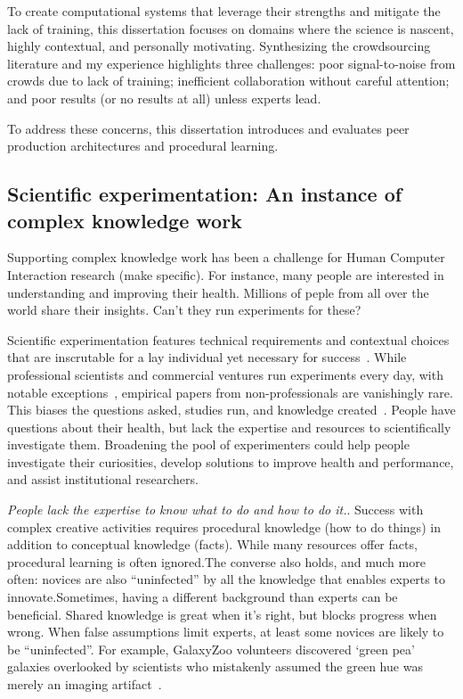 To create computational systems that leverage their strengths and mitigate the lack of training, this dissertation 
focuses on domains where the science is nascent, highly contextual, and personally motivating.
 Synthesizing the crowdsourcing literature and my experience highlights three challenges: 
poor signal-to-noise from crowds due to lack of training; inefficient collaboration without 
careful attention; and poor results (or no results at all) unless experts lead. 

To address  these concerns,  this dissertation introduces and evaluates peer production architectures 
and procedural learning.

\subsection{Scientific experimentation: An instance of complex knowledge work}
Supporting complex knowledge work has been a challenge for Human Computer Interaction
 research (make specific). For instance, many people are interested in understanding and 
improving their health. Millions of peple from all over the world share their insights. 
Can't they run experiments for these?

Scientific experimentation features technical requirements and contextual choices 
that are inscrutable for a lay individual yet necessary for success~\cite{Martin2007}. While 
professional scientists and commercial ventures run experiments every day, with 
notable exceptions~\cite{Cooper2010,DanaLewis}, empirical papers from non-professionals are 
vanishingly rare. This biases the questions asked, studies run, and knowledge 
created~\cite{Henrich2010a}. People have questions about their health, but lack the expertise 
and resources to scientifically investigate them. Broadening the pool of 
experimenters could help people investigate their curiosities, develop solutions 
to improve health and performance, and assist institutional researchers.

\textit{People lack the expertise to know what to do and how to do it.}. 
Success with complex creative activities requires procedural
knowledge (how to do things) in addition to conceptual
knowledge (facts). While many resources offer facts, procedural
learning is often ignored.The converse also holds, and much more often: novices are also
“uninfected” by all the knowledge that enables experts to
innovate.Sometimes, having a different background than experts can
be beneficial. Shared knowledge is great when it’s right, but
blocks progress when wrong. When false assumptions limit
experts, at least some novices are likely to be “uninfected”.
For example, GalaxyZoo volunteers discovered ‘green pea’
galaxies overlooked by scientists who mistakenly assumed
the green hue was merely an imaging artifact~\cite{cardamone2009galaxy}. 


